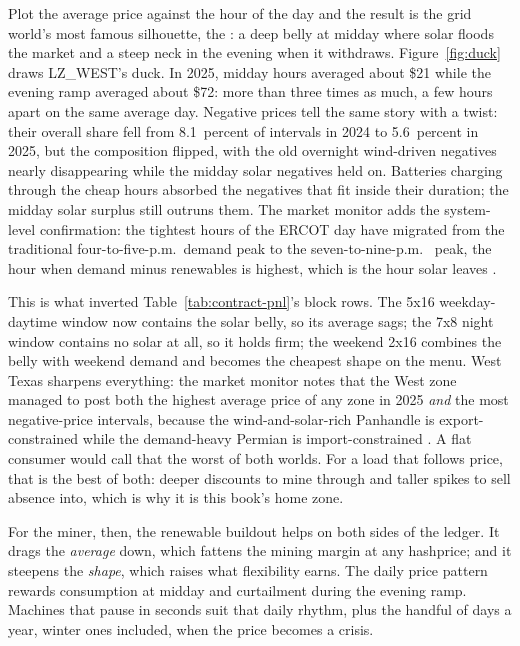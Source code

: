 Plot the average price against the hour of the day and the result is the grid world's most famous silhouette, the : a deep belly at midday where solar floods the market and a steep neck in the evening when it withdraws. Figure~\ref{fig:duck} draws LZ\_WEST's duck. In 2025, midday hours averaged about \$21 while the evening ramp averaged about \$72: more than three times as much, a few hours apart on the same average day. %
Negative prices tell the same story with a twist: their overall share fell from 8.1~percent of intervals in 2024 to 5.6~percent in 2025, but the composition flipped, with the old overnight wind-driven negatives nearly disappearing while the midday solar negatives held on. %
Batteries charging through the cheap hours absorbed the negatives that fit inside their duration; the midday solar surplus still outruns them. The market monitor adds the system-level confirmation: the tightest hours of the ERCOT day have migrated from the traditional four-to-five-p.m.\ demand peak to the seven-to-nine-p.m.\  peak, the hour when demand minus renewables is highest, which is the hour solar leaves \autocite{potomac2026somercot}. %

This is what inverted Table~\ref{tab:contract-pnl}'s block rows. The 5x16 weekday-daytime window now contains the solar belly, so its average sags; the 7x8 night window contains no solar at all, so it holds firm; the weekend 2x16 combines the belly with weekend demand and becomes the cheapest shape on the menu. West Texas sharpens everything: the market monitor notes that the West zone managed to post both the highest average price of any zone in 2025 \emph{and} the most negative-price intervals, because the wind-and-solar-rich Panhandle is export-constrained while the demand-heavy Permian is import-constrained \autocite{potomac2026somercot}. %
A flat consumer would call that the worst of both worlds. For a load that follows price, that is the best of both: deeper discounts to mine through and taller spikes to sell absence into, which is why it is this book's home zone.

For the miner, then, the renewable buildout helps on both sides of the ledger. It drags the \emph{average} down, which fattens the mining margin at any hashprice; and it steepens the \emph{shape}, which raises what flexibility earns. The daily price pattern rewards consumption at midday and curtailment during the evening ramp. Machines that pause in seconds suit that daily rhythm, plus the handful of days a year, winter ones included, when the price becomes a crisis. %

